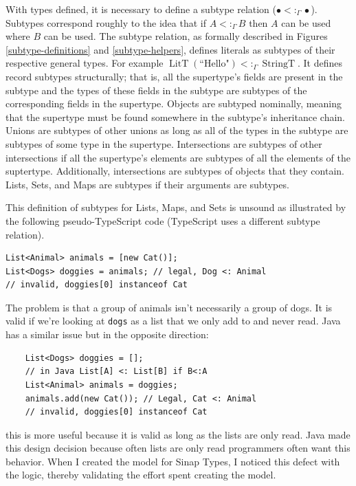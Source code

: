 \documentclass[12pt]{article}
\DeclareMathOperator{\StringT}{StringT}
\DeclareMathOperator{\LitT}{LitT}
\newcommand{\subtype}{<:_\Gamma}
\begin{document}
With types defined, it is necessary to define a subtype 
relation (\(\bullet\subtype\bullet\)). Subtypes correspond 
roughly to the idea that if \(A\subtype B\) then \(A\)
can be used where \(B\) can be used. The subtype relation,
as formally described in Figures \ref{subtype-definitions} and \ref{subtype-helpers}, 
defines literals as subtypes of their respective general types.
For example \(\LitT(\text{``Hello"})\subtype\StringT\). It defines
record subtypes structurally; that is, all the supertype's fields 
are present in the subtype and the types of these fields in the subtype
are subtypes of the corresponding fields in the supertype. 
Objects are subtyped nominally, meaning that the supertype must be
found somewhere in the subtype's inheritance chain. Unions are
subtypes of other unions as long as all of the types in the 
subtype are subtypes of some type in the supertype. Intersections are 
subtypes of other intersections if all the supertype's elements are 
subtypes of all the elements of the suptertype. Additionally, 
intersections are subtypes of objects that they contain. Lists, 
Sets, and Maps are subtypes if their arguments are subtypes. 

This definition of subtypes for Lists, Maps, and Sets is unsound
as illustrated by the following pseudo-TypeScript code 
(TypeScript uses a different subtype relation).

\begin{verbatim}
List<Animal> animals = [new Cat()];
List<Dogs> doggies = animals; // legal, Dog <: Animal
// invalid, doggies[0] instanceof Cat
\end{verbatim}

The problem is that a group of animals isn't necessarily a 
group of dogs. It is valid if we're looking at \texttt{dogs}
as a list that we only add to and never read. Java has a similar
issue but in the opposite direction: 

\begin{verbatim}
    List<Dogs> doggies = [];
    // in Java List[A] <: List[B] if B<:A
    List<Animal> animals = doggies; 
    animals.add(new Cat()); // Legal, Cat <: Animal
    // invalid, doggies[0] instanceof Cat
\end{verbatim}

this is more useful because it is valid as long as the 
lists are only read. Java made this design decision 
because often lists are only read programmers often want
this behavior. When I created the model for Sinap Types,
I noticed this defect with the logic, thereby validating 
the effort spent creating the model. 
\end{document}
